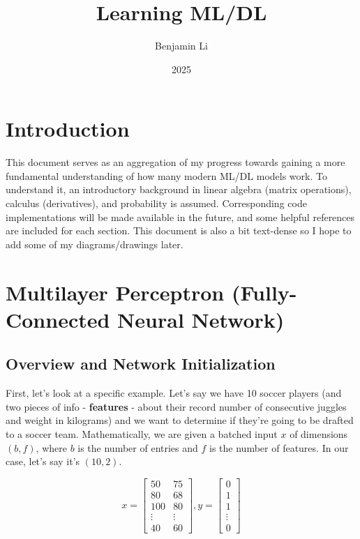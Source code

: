 \documentclass[12pt]{article}
\title{Learning ML/DL}
\author{Benjamin Li}
\date{2025}
\begin{document}
\maketitle

\section{Introduction}

This document serves as an aggregation of my progress towards gaining a more fundamental understanding of how many modern ML/DL models work. To understand it, an introductory background in linear algebra (matrix operations), calculus (derivatives), and probability is assumed. Corresponding code implementations will be made available in the future, and some helpful references are included for each section. This document is also a bit text-dense so I hope to add some of my diagrams/drawings later. 


\section{Multilayer Perceptron (Fully-Connected Neural Network)}
\subsection{Overview and Network Initialization}

First, let's look at a specific example. Let's say we have 10 soccer players (and two pieces of info - \textbf{features} - about their record number of consecutive juggles and weight in kilograms) and we want to determine if they're going to be drafted to a soccer team. Mathematically, we are given a batched input $x$ of dimensions $(b, f)$, where $b$ is the number of entries and $f$ is the number of features. In our case, let’s say it's $(10, 2)$. 

\[x=\begin{bmatrix}
50 & 75 \\
80 & 68 \\
100 & 80 \\
\vdots & \vdots \\
40 & 60
\end{bmatrix}, y=\begin{bmatrix}
0 \\
1 \\
1 \\
\vdots \\
0
\end{bmatrix}\]
\end{document}
